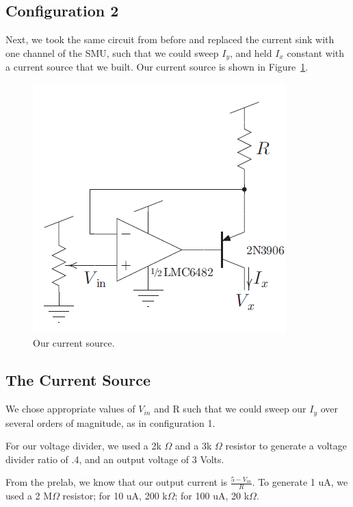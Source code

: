 \documentclass{article}
\begin{document}
\subsection*{Configuration 2}

Next, we took the same circuit from before and replaced the current sink with one channel of the SMU, such that we could sweep $I_y$, and held $I_x$ constant with a current source that we built.  Our current source is shown in Figure~\ref{fig:source}.

\begin{figure}[H]
\begin{center}
\includegraphics[scale=.5]{source.png}
\caption{Our current source.}
\label{fig:source}
\end{center}
\end{figure}

\subsection*{The Current Source}

We chose appropriate values of $V_{in}$ and R such that we could sweep our $I_y$ over several orders of magnitude, as in configuration 1.

For our voltage divider, we used a 2k $\Omega$ and a 3k $\Omega$ resistor to generate a voltage divider ratio of .4, and an output voltage of 3 Volts.

From the prelab, we know that our output current is $\frac{5 - V_{in}}{R}$.  To generate 1 uA, we used a 2 M$\Omega$ resistor; for 10 uA, 200 k$\Omega$; for 100 uA, 20 k$\Omega$.
\end{document}
